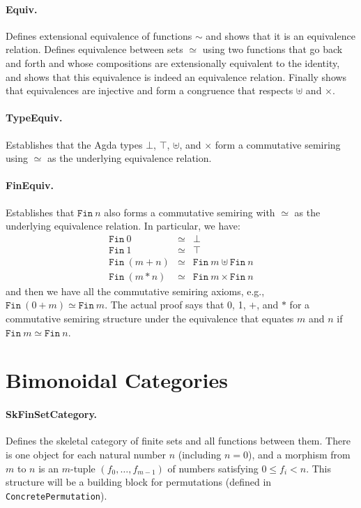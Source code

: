 \documentclass{article}
\begin{document}
\paragraph*{Equiv.} Defines extensional equivalence of functions
$\sim$ and shows that it is an equivalence relation. Defines
equivalence between sets $\simeq$ using two functions that go back and
forth and whose compositions are extensionally equivalent to the
identity, and shows that this equivalence is indeed an equivalence
relation. Finally shows that equivalences are injective and form a
congruence that respects $\uplus$ and $\times$. 

\paragraph*{TypeEquiv.} Establishes that the Agda types $\bot$,
$\top$, $\uplus$, and $\times$ form a commutative semiring using
$\simeq$ as the underlying equivalence relation.

\paragraph*{FinEquiv.} Establishes that $\texttt{Fin}~n$ also forms a
commutative semiring with $\simeq$ as the underlying equivalence
relation. In particular, we have:
\[\begin{array}{rcll}
\texttt{Fin}~0 &\simeq& \bot \\
\texttt{Fin}~1 &\simeq& \top \\
\texttt{Fin}~(m+n) &\simeq& \texttt{Fin}~m \uplus \texttt{Fin}~n \\
\texttt{Fin}~(m*n) &\simeq& \texttt{Fin}~m \times \texttt{Fin}~n
\end{array}\]
and then we have all the commutative semiring axioms, e.g.,
$\texttt{Fin}~(0+m) \simeq \texttt{Fin}~m$. The actual proof says that
0, 1, $+$, and $*$ for a commutative semiring structure under the
equivalence that equates $m$ and $n$ if
$\texttt{Fin}~m \simeq \texttt{Fin}~n$.

\section{Bimonoidal Categories} 

\paragraph*{SkFinSetCategory.} Defines the skeletal category of finite
sets and all functions between them. There is one object for each
natural number $n$ (including $n=0$), and a morphism from $m$ to $n$
is an $m$-tuple $(f_0,\ldots,f_{m−1})$ of numbers satisfying
$0 \leq f_i < n$. This structure will be a building block for
permutations (defined in \texttt{ConcretePermutation}).
\end{document}
